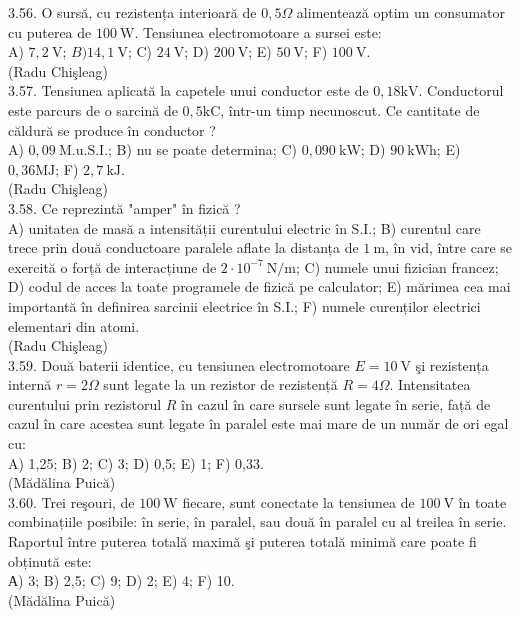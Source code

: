 \documentclass[10pt]{article}
\begin{document}
3.56. O sursă, cu rezistența interioară de $0,5 \Omega$ alimentează optim un consumator cu puterea de $100 \mathrm{~W}$. Tensiunea electromotoare a sursei este:\\ A) $7,2 \mathrm{~V}$; $B) 14,1 \mathrm{~V}$; C) $24 \mathrm{~V}$; D) $200 \mathrm{~V}$; E)  $50 \mathrm{~V}$; F)  $100 \mathrm{~V}$.\\ (Radu Chişleag)\\

3.57. Tensiunea aplicată la capetele unui conductor este de $0,18 \mathrm{kV}$. Conductorul este parcurs de o sarcină de $0,5 \mathrm{kC}$, într-un timp necunoscut. Ce cantitate de căldură se produce în conductor ?\\ A) $0,09 \mathrm{~M.u.S.I.}$; B) nu se poate determina; C) $0,090 \mathrm{~kW}$; D) $90 \mathrm{~kWh}$; E) $0,36 \mathrm{MJ}$; F) $2,7 \mathrm{~kJ}$.\\ (Radu Chişleag)\\

3.58. Ce reprezintă "amper" în fizică ?\\ A) unitatea de masă a intensității curentului electric în S.I.; B) curentul care trece prin două conductoare paralele aflate la distanța de $1 \mathrm{~m}$, în vid, între care se exercită o forță de interacțiune de $2 \cdot 10^{-7} \mathrm{~N} / \mathrm{m}$; C) numele unui fizician francez; D) codul de acces la toate programele de fizică pe calculator; E) mărimea cea mai importantă în definirea sarcinii electrice în S.I.; F) numele curenților electrici elementari din atomi.\\ (Radu Chişleag)\\

3.59. Două baterii identice, cu tensiunea electromotoare $E=10 \mathrm{~V}$ şi rezistența internă $r=2 \Omega$ sunt legate la un rezistor de rezistență $R=4 \Omega$. Intensitatea curentului prin rezistorul $R$ în cazul în care sursele sunt legate în serie, față de cazul în care acestea sunt legate în paralel este mai mare de un număr de ori egal cu:\\ A) 1,25; B) 2; C) 3; D) 0,5; E) 1; F) 0,33.\\ (Mădălina Puică)\\

3.60. Trei reşouri, de $100 \mathrm{~W}$ fiecare, sunt conectate la tensiunea de $100 \mathrm{~V}$ în toate combinațiile posibile: în serie, în paralel, sau două în paralel cu al treilea în serie. Raportul între puterea totală maximă şi puterea totală minimă care poate fi obținută este:\\ А) 3; B) 2,5; C) 9; D) 2; E) 4; F) 10.\\ (Mădălina Puică)\\
\end{document}
